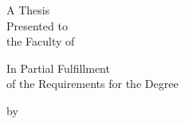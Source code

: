 \begin{titlepage}
\thispagestyle{empty}
\begin{center}
{\bfseries\MakeUppercase{\ThesisTitle}\par}

\vfill

A Thesis\\[0.5em]
Presented to\\[0.5em]
the Faculty of \UniversityName

\vfill

In Partial Fulfillment\\[0.5em]
of the Requirements for the Degree\\[0.5em]
\DegreeName

\vfill

by\\[0.5em]
\ThesisAuthor\\[1em]
\SubmissionDate
\end{center}
\end{titlepage}
